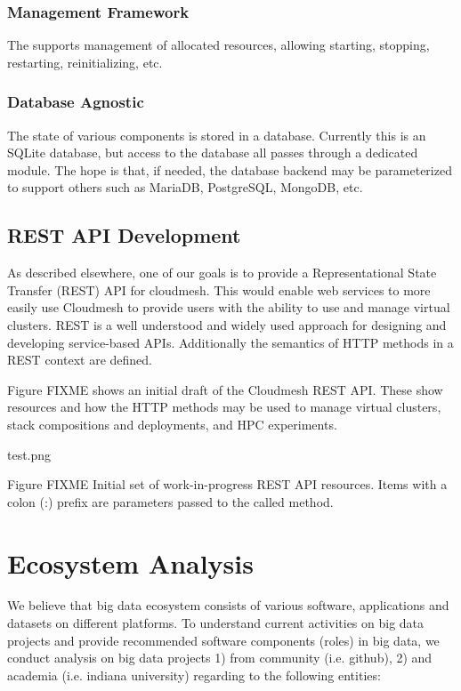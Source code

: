 \documentclass[9pt,twocolumn,twoside]{styles/osajnl}
\begin{document}
\subsubsection{Management Framework}

The supports management of allocated resources, allowing starting, stopping, restarting, reinitializing, etc.


\subsubsection{Database Agnostic}

The state of various components is stored in a database. Currently this is an SQLite database, but access to the database all passes through a dedicated module. The hope is that, if needed, the database backend may be parameterized to support others such as MariaDB, PostgreSQL, MongoDB, etc.




\subsection{REST API Development}

As described elsewhere, one of our goals is to provide a Representational State Transfer (REST) API for cloudmesh. This would enable web services to more easily use Cloudmesh to provide users with the ability to use and manage virtual clusters.  REST is a well understood and widely used approach for designing and developing service-based APIs. Additionally the semantics of HTTP methods in a REST context are defined.


Figure FIXME shows an initial draft of the Cloudmesh REST API. These show resources and how the HTTP methods may be used to manage virtual clusters, stack compositions and deployments, and HPC experiments.


 test.png 

Figure FIXME Initial set of work-in-progress REST API resources.
Items with a colon (:) prefix are parameters passed to the called method.




\section{Ecosystem Analysis}



We believe that big data ecosystem consists of various software, applications and datasets on different platforms. To understand current activities on big data projects and provide recommended software components (roles) in big data, we conduct analysis on big data projects 1) from community (i.e. github), 2) and academia (i.e. indiana university) regarding to the following entities:
\end{document}
